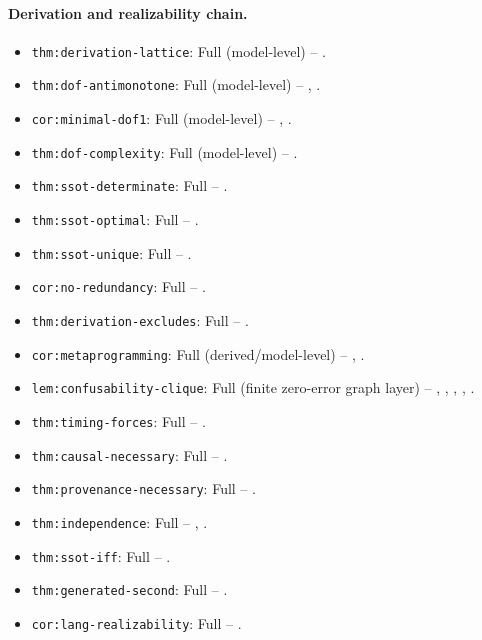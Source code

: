 \paragraph{Derivation and realizability chain.}
\begin{itemize}
\item \nolinkurl{thm:derivation-lattice}: Full (model-level) -- .
\item \nolinkurl{thm:dof-antimonotone}: Full (model-level) -- , .
\item \nolinkurl{cor:minimal-dof1}: Full (model-level) -- , .
\item \nolinkurl{thm:dof-complexity}: Full (model-level) -- .
\item \nolinkurl{thm:ssot-determinate}: Full -- .
\item \nolinkurl{thm:ssot-optimal}: Full -- .
\item \nolinkurl{thm:ssot-unique}: Full -- .
\item \nolinkurl{cor:no-redundancy}: Full -- .
\item \nolinkurl{thm:derivation-excludes}: Full -- .
\item \nolinkurl{cor:metaprogramming}: Full (derived/model-level) -- , .
\item \nolinkurl{lem:confusability-clique}: Full (finite zero-error graph layer) -- , , , , .
\item \nolinkurl{thm:timing-forces}: Full -- .
\item \nolinkurl{thm:causal-necessary}: Full -- .
\item \nolinkurl{thm:provenance-necessary}: Full -- .
\item \nolinkurl{thm:independence}: Full -- , .
\item \nolinkurl{thm:ssot-iff}: Full -- .
\item \nolinkurl{thm:generated-second}: Full -- .
\item \nolinkurl{cor:lang-realizability}: Full -- .
\end{itemize}

